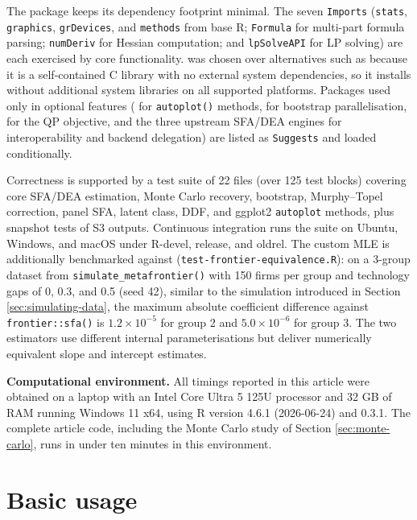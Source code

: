The package keeps its dependency footprint minimal. The seven \texttt{Imports}
(\texttt{stats}, \texttt{graphics}, \texttt{grDevices}, and \texttt{methods} from base \textsf{R};
\texttt{Formula} for multi-part formula parsing; \texttt{numDeriv} for Hessian
computation; and \texttt{lpSolveAPI} for LP solving) are each exercised by core
functionality.  was chosen over alternatives such as
 because it is a self-contained C library with no external
system dependencies, so it installs without additional system libraries
on all supported platforms. Packages used
only in optional features ( for \texttt{autoplot()} methods,
 for bootstrap parallelisation,  for the QP
objective, and the three upstream SFA/DEA engines for interoperability and
backend delegation) are listed as \texttt{Suggests} and loaded conditionally.

Correctness is supported by a test suite of 22  files
(over 125 test blocks) covering core SFA/DEA estimation, Monte Carlo
recovery, bootstrap, Murphy--Topel correction, panel SFA, latent class,
DDF, and ggplot2 \texttt{autoplot} methods, plus snapshot tests of S3
outputs. Continuous integration runs the suite on Ubuntu, Windows, and
macOS under R-devel, release, and oldrel. The custom MLE is
additionally benchmarked against 
(\texttt{test-frontier-equivalence.R}): on a 3-group dataset from
\texttt{simulate\_metafrontier()} with 150 firms per group and technology gaps of
0, 0.3, and 0.5 (seed 42), similar to the simulation introduced in
Section \ref{sec:simulating-data}, the maximum absolute coefficient difference against
\texttt{frontier::sfa()} is \(1.2 \times 10^{-5}\) for group 2 and
\(5.0 \times 10^{-6}\) for group 3. The two estimators use different
internal parameterisations but deliver numerically equivalent slope and
intercept estimates.

\textbf{Computational environment.} All timings reported in this article were
obtained on a laptop with an Intel Core Ultra 5 125U processor and 32 GB
of RAM running Windows 11 x64, using R version 4.6.1 (2026-06-24) and
 0.3.1.
The complete article code, including the Monte Carlo study of Section \ref{sec:monte-carlo},
runs in under ten minutes in this environment.

\section{Basic usage}\label{sec:basic-usage}

